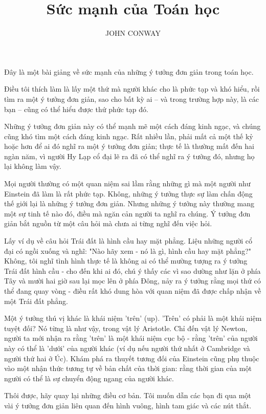 \documentclass[12pt,a4paper]{article}
\title{\textbf{Sức mạnh của Toán học}}
\author{JOHN CONWAY}
\date{}
\begin{document}
\maketitle

Đây là một bài giảng về sức mạnh của những ý tưởng đơn giản trong toán học.

Điều tôi thích làm là lấy một thứ mà người khác cho là phức tạp và khó hiểu, rồi tìm ra một ý tưởng đơn giản, sao cho bất kỳ ai – và trong trường hợp này, là các bạn – cũng có thể hiểu được thứ phức tạp đó.

Những ý tưởng đơn giản này có thể mạnh mẽ một cách đáng kinh ngạc, và chúng cũng khó tìm một cách đáng kinh ngạc. Rất nhiều lần, phải mất cả một thế kỷ hoặc hơn để ai đó nghĩ ra một ý tưởng đơn giản; thực tế là thường mất đến hai ngàn năm, vì người Hy Lạp cổ đại lẽ ra đã có thể nghĩ ra ý tưởng đó, nhưng họ lại không làm vậy.

Mọi người thường có một quan niệm sai lầm rằng những gì mà một người như Einstein đã làm là rất phức tạp. Không, những ý tưởng thực sự làm chấn động thế giới lại là những ý tưởng đơn giản. Nhưng những ý tưởng này thường mang một sự tinh tế nào đó, điều mà ngăn cản người ta nghĩ ra chúng. Ý tưởng đơn giản bắt nguồn từ một câu hỏi mà chưa ai từng nghĩ đến việc hỏi.

Lấy ví dụ về câu hỏi Trái đất là hình cầu hay mặt phẳng. Liệu những người cổ đại có ngồi xuống và nghĩ: "Nào hãy xem - nó là gì, hình cầu hay mặt phẳng?" Không, tôi nghĩ tình hình thực tế là không ai có thể mường tượng ra ý tưởng Trái đất hình cầu - cho đến khi ai đó, chú ý thấy các vì sao dường như lặn ở phía Tây và mười hai giờ sau lại mọc lên ở phía Đông, nảy ra ý tưởng rằng mọi thứ có thể đang quay vòng - điều rất khó dung hòa với quan niệm đã được chấp nhận về một Trái đất phẳng.

Một ý tưởng thú vị khác là khái niệm 'trên' (up). 'Trên' có phải là một khái niệm tuyệt đối? Nó từng là như vậy, trong vật lý Aristotle. Chỉ đến vật lý Newton, người ta mới nhận ra rằng 'trên' là một khái niệm cục bộ - rằng 'trên' của người này có thể là 'dưới' của người khác (ví dụ nếu người thứ nhất ở Cambridge và người thứ hai ở Úc). Khám phá ra thuyết tương đối của Einstein cũng phụ thuộc vào một nhận thức tương tự về bản chất của thời gian: rằng thời gian của một người có thể là sự chuyển động ngang của người khác.

Thôi được, hãy quay lại những điều cơ bản. Tôi muốn dẫn các bạn đi qua một vài ý tưởng đơn giản liên quan đến hình vuông, hình tam giác và các nút thắt.
\end{document}
